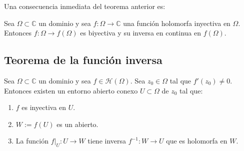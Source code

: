 Una consecuencia inmediata del teorema anterior es:

\begin{corolario}
    Sea $\Omega \subset \mathbb{C}$ un dominio y sea $f : \Omega \to \mathbb{C}$ una función holomorfa inyectiva en $\Omega$. Entonces $f : \Omega \to f(\Omega)$ es biyectiva y su inversa en continua en $f(\Omega)$.
\end{corolario}

\subsection{Teorema de la función inversa}

\begin{teorema} 
    Sea $\Omega \subset \mathbb{C}$ un dominio y sea $f \in \mathcal{H}(\Omega)$. Sea $z_0 \in \Omega$ tal que $f'(z_0) \neq 0$. Entonces existen un entorno abierto conexo $U \subset \Omega$ de $z_0$ tal que:
    \begin{enumerate}
        \item $f$ es inyectiva en $U$.
        \item $W := f(U)$ es un abierto.
        \item La función $f |_U : U \to W$ tiene inversa $f^{-1} : W \to U$ que es holomorfa en $W$.
    \end{enumerate}
\end{teorema}

